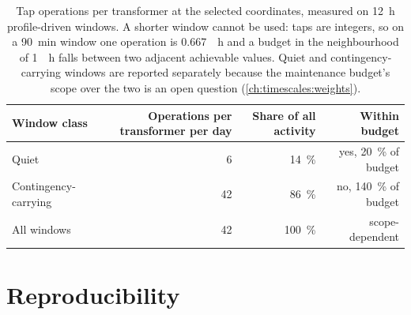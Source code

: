 \begin{table}[htbp]
	\centering
	\caption[Switching wear at the selected coordinates.]%
	{Tap operations per transformer at the selected coordinates, measured on \qty{12}{\hour} profile-driven windows.
		A shorter window cannot be used: taps are integers, so on a \qty{90}{\minute} window one operation is \qty{0.667}{\per\hour} and a budget in the neighbourhood of \qty{1}{\per\hour} falls between two adjacent achievable values.
		Quiet and contingency-carrying windows are reported separately because the maintenance budget's scope over the two is an open question (\cref{ch:timescales:weights}).}
	\label{tab:app_wsel:wear}
	\small
	\begin{tabular}{l r r r}
		\toprule
		Window class & Operations per transformer per day & Share of all activity & Within budget \\
		\midrule
		Quiet                        & \num{6} & \qty{14}{\percent} & yes, \qty{20}{\percent} of budget \\
		Contingency-carrying         & \num{42} & \qty{86}{\percent} & no, \qty{140}{\percent} of budget \\
		\midrule
		All windows                  & \num{42} & \qty{100}{\percent} & scope-dependent \\
		\bottomrule
	\end{tabular}
\end{table}


\section{Reproducibility}\label{ch:app_wsel:repro}

